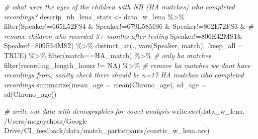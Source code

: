 \documentclass[
]{article}
\newenvironment{Shaded}{\begin{snugshade}}{\end{snugshade}}
\newcommand{\AttributeTok}[1]{\textcolor[rgb]{0.77,0.63,0.00}{#1}}
\newcommand{\CommentTok}[1]{\textcolor[rgb]{0.56,0.35,0.01}{\textit{#1}}}
\newcommand{\ConstantTok}[1]{\textcolor[rgb]{0.00,0.00,0.00}{#1}}
\newcommand{\FunctionTok}[1]{\textcolor[rgb]{0.00,0.00,0.00}{#1}}
\newcommand{\NormalTok}[1]{#1}
\newcommand{\OtherTok}[1]{\textcolor[rgb]{0.56,0.35,0.01}{#1}}
\newcommand{\SpecialCharTok}[1]{\textcolor[rgb]{0.00,0.00,0.00}{#1}}
\newcommand{\StringTok}[1]{\textcolor[rgb]{0.31,0.60,0.02}{#1}}
\begin{document}
\begin{Shaded}
\begin{Highlighting}[]
\CommentTok{\# what were the ages of the children with NH (HA matches) who completed recordings? }
\NormalTok{descrip\_nh\_lena\_stats }\OtherTok{\textless{}{-}}\NormalTok{ data\_w\_lena }\SpecialCharTok{\%\textgreater{}\%} 
   \FunctionTok{filter}\NormalTok{(Speaker}\SpecialCharTok{!=}\StringTok{\textquotesingle{}665L52FS4\textquotesingle{}} \SpecialCharTok{\&}\NormalTok{ Speaker}\SpecialCharTok{!=}\StringTok{\textquotesingle{}679L58MS6\textquotesingle{}} \SpecialCharTok{\&}\NormalTok{ Speaker}\SpecialCharTok{!=}\StringTok{\textquotesingle{}802E72FS3\textquotesingle{}} \SpecialCharTok{\&} \CommentTok{\# remove children who recorded 3+ months after testing}
\NormalTok{           Speaker}\SpecialCharTok{!=}\StringTok{\textquotesingle{}806E42MS1\textquotesingle{}}\SpecialCharTok{\&}\NormalTok{ Speaker}\SpecialCharTok{!=}\StringTok{\textquotesingle{}809E64MS2\textquotesingle{}}\NormalTok{) }\SpecialCharTok{\%\textgreater{}\%}
  \FunctionTok{distinct\_at}\NormalTok{(., }\FunctionTok{vars}\NormalTok{(Speaker, match), }\AttributeTok{.keep\_all =} \ConstantTok{TRUE}\NormalTok{) }\SpecialCharTok{\%\textgreater{}\%}
  \FunctionTok{filter}\NormalTok{(match}\SpecialCharTok{==}\StringTok{\textquotesingle{}HA\_match\textquotesingle{}}\NormalTok{) }\SpecialCharTok{\%\textgreater{}\%} \CommentTok{\# only ha matches}
  \FunctionTok{filter}\NormalTok{(recording\_length\_hours }\SpecialCharTok{!=} \StringTok{\textquotesingle{}NA\textquotesingle{}}\NormalTok{) }\SpecialCharTok{\%\textgreater{}\%} \CommentTok{\# remove ha matches we don\textquotesingle{}t have recordings from; sanity check there should be n=17 HA matches who completed recordings}
  \FunctionTok{summarize}\NormalTok{(}\AttributeTok{mean\_age =} \FunctionTok{mean}\NormalTok{(Chrono\_age),}
            \AttributeTok{sd\_age =} \FunctionTok{sd}\NormalTok{(Chrono\_age))}
\end{Highlighting}
\end{Shaded}

\begin{Shaded}
\begin{Highlighting}[]
\CommentTok{\# write out data with demographics for vowel analysis}
\FunctionTok{write.csv}\NormalTok{(data\_w\_lena, }\StringTok{\textquotesingle{}/Users/megcychosz/Google Drive/CI\_feedback/data/match\_participants/coartic\_w\_lena.csv\textquotesingle{}}\NormalTok{)}
\end{Highlighting}
\end{Shaded}
\end{document}
